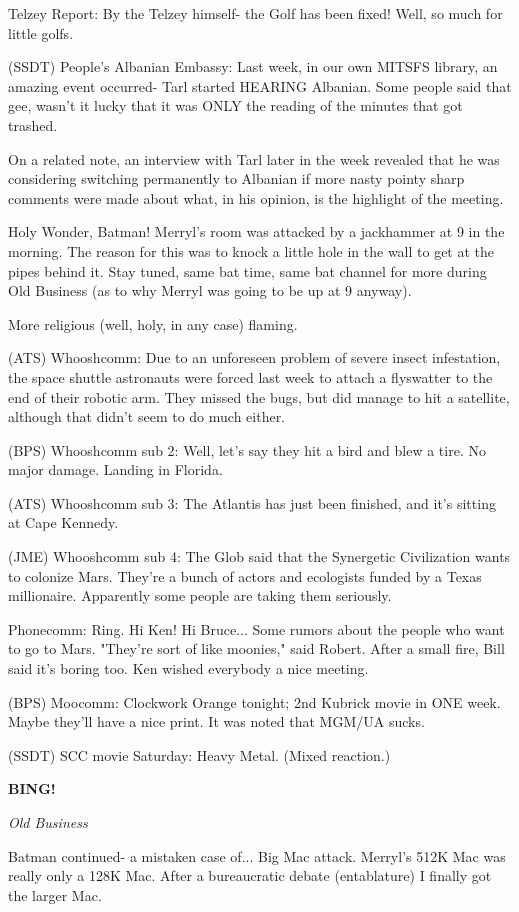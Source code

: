 \documentclass[12pt]{article}
\newcommand{\bing}{{\bf BING!} }
\newcommand{\goto}[1]{\bing \vskip 12pt \centerline{{\em{#1}}}}
\begin{document}
Telzey Report: By the Telzey himself- the Golf has been fixed! Well, so much for little golfs.

(SSDT) People's Albanian Embassy: Last week, in our own MITSFS library, an amazing event occurred- Tarl started HEARING Albanian. Some people said that gee, wasn't it lucky that it was ONLY the reading of the minutes that got trashed.

On a related note, an interview with Tarl later in the week revealed that he was considering switching permanently to Albanian if more nasty pointy sharp comments were made about what, in his opinion, is the highlight of the meeting.

Holy Wonder, Batman! Merryl's room was attacked by a jackhammer at 9 in the morning. The reason for this was to knock a little hole in the wall to get at the pipes behind it. Stay tuned, same bat time, same bat channel for more during Old Business (as to why Merryl was going to be up at 9 anyway).

More religious (well, holy, in any case) flaming.

(ATS) Whooshcomm: Due to an unforeseen problem of severe insect infestation, the space shuttle astronauts were forced last week to attach a flyswatter to the end of their robotic arm. They missed the bugs, but did manage to hit a satellite, although that didn't seem to do much either.

(BPS) Whooshcomm sub 2: Well, let's say they hit a bird and blew a tire. No major damage. Landing in Florida.

(ATS) Whooshcomm sub 3: The Atlantis has just been finished, and it's sitting at Cape Kennedy.

(JME) Whooshcomm sub 4: The Glob said that the Synergetic Civilization wants to colonize Mars. They're a bunch of actors and ecologists funded by a Texas millionaire. Apparently some people are taking them seriously.

Phonecomm: Ring. Hi Ken! Hi Bruce... Some rumors about the people who want to go to Mars. "They're sort of like moonies," said Robert. After a small fire, Bill said it's boring too. Ken wished everybody a nice meeting.

(BPS) Moocomm: Clockwork Orange tonight; 2nd Kubrick movie in ONE week. Maybe they'll have a nice print. It was noted that MGM/UA sucks.

(SSDT) SCC movie Saturday: Heavy Metal. (Mixed reaction.)

\goto{Old Business}

Batman continued- a mistaken case of... Big Mac attack. Merryl's 512K Mac was really only a 128K Mac. After a bureaucratic debate (entablature) I finally got the larger Mac.
\end{document}
